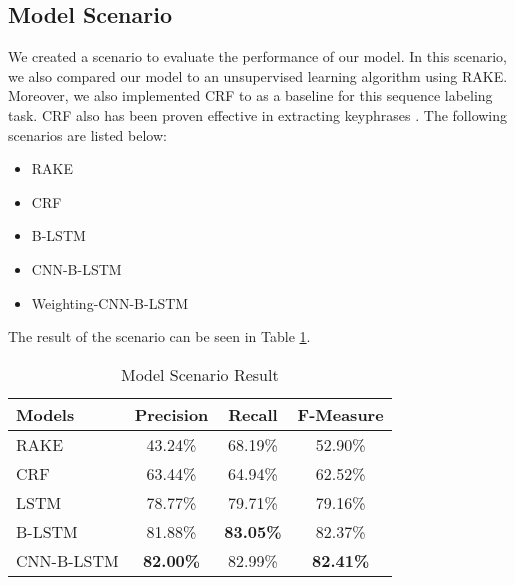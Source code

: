 \subsection{Model Scenario}
We created a scenario to evaluate the performance of our model. In this scenario, we also compared our model to an unsupervised learning algorithm using RAKE. Moreover, we also implemented CRF to as a baseline for this sequence labeling task. CRF also has been proven effective in extracting keyphrases \cite{cao2010automatically} \cite{zhang2008automatic}. The following scenarios are listed below:
\begin{itemize}
	\item RAKE
	\item CRF
	\item B-LSTM
	\item CNN-B-LSTM
	\item Weighting-CNN-B-LSTM
\end{itemize}
The result of the scenario can be seen in Table \ref{tab:model_scenario}.
\begin{table}
	\caption{Model Scenario Result}
	\label{tab:model_scenario}
	\begin{tabular}{lccc}
		\toprule
		Models&Precision&Recall&F-Measure\\
		\midrule
		RAKE & 43.24\% & 68.19\% & 52.90\% \\
		
		CRF & 63.44\% & 64.94\% & 62.52\% \\
		
		LSTM & 78.77\% & 79.71\% & 79.16\% \\
		
		B-LSTM & 81.88\% & \textbf{83.05\%} & 82.37\% \\
		
		CNN-B-LSTM & \textbf{82.00\%} & 82.99\% & \textbf{82.41\%} \\
		
		\bottomrule
	\end{tabular}
\end{table}
